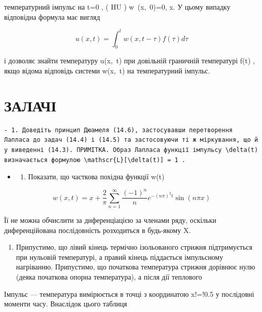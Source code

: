 \documentclass[
  ukrainian,
]{article}
\providecommand{\tightlist}{%
  \setlength{\itemsep}{0pt}\setlength{\parskip}{0pt}}
\begin{document}
температурний імпульс на t=0 , ( HU ) w~(x,~0)=0,
\leqslant x. У цьому випадку відповідна формула має
вигляд

\[
u(x, t) = \int_{0}^{t} w(x, t-\tau) f(\tau) d\tau
\]

і дозволяє знайти температуру u\left(x,~t\right) при довільній граничній
температурі f\left(t\right) , якщо відома відповідь системи
w\left(x,~t\right) на температурний імпульс.

\section{ЗАЛАЧІ}\label{ux437ux430ux43bux430ux447ux456}

\begin{verbatim}
- 1. Доведіть принцип Дюамеля (14.6), застосувавши перетворення Лапласа до задач (14.4) і (14.5) та застосовуючи ті ж міркування, що й у виведенні (14.3). ПРИМІТКА. Образ Лапласа функції імпульсу \delta(t) визначається формулою \mathscr{L}[\delta(t)] = 1 .
\end{verbatim}

\begin{itemize}
\tightlist
\item
  \begin{enumerate}
  \def\labelenumi{\arabic{enumi}.}
  \setcounter{enumi}{1}
  \tightlist
  \item
    Показати, що часткова похідна функції w(t)
  \end{enumerate}
\end{itemize}

\[
w(x, t) = x + \frac{2}{\pi} \sum_{n=1}^{\infty} \frac{(-1)^n}{n} e^{-(n\pi)^2 t} \sin(n\pi x)
\]

Її не можна обчислити за диференціацією за членами ряду, оскільки
диференційована послідовність розходиться в будь-якому X.

\begin{enumerate}
\def\labelenumi{\arabic{enumi}.}
\setcounter{enumi}{2}
\tightlist
\item
  Припустимо, що лівий кінець термічно ізольованого стрижня
  підтримується при нульовій температурі, а правий кінець піддається
  імпульсному нагріванню. Припустимо, що початкова температура стрижня
  дорівнює нулю (деяка початкова опорна температура), а після дії
  теплового
\end{enumerate}

Імпульс --- температура вимірюється в точці з координатою x!=!0.5 у
послідовні моменти часу. Внаслідок цього таблиця
\end{document}
